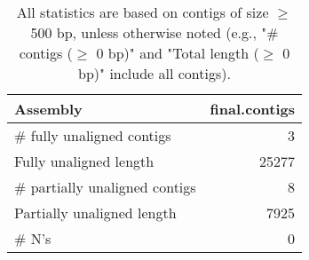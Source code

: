 \documentclass[12pt,a4paper]{article}
\begin{document}
\begin{table}[ht]
\begin{center}
\caption{All statistics are based on contigs of size $\geq$ 500 bp, unless otherwise noted (e.g., "\# contigs ($\geq$ 0 bp)" and "Total length ($\geq$ 0 bp)" include all contigs).}
\begin{tabular}{|l*{1}{|r}|}
\hline
Assembly & final.contigs \\ \hline
\# fully unaligned contigs & 3 \\ \hline
Fully unaligned length & 25277 \\ \hline
\# partially unaligned contigs & 8 \\ \hline
Partially unaligned length & 7925 \\ \hline
\# N's & 0 \\ \hline
\end{tabular}
\end{center}
\end{table}
\end{document}
